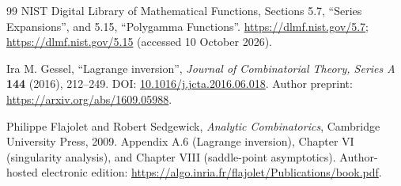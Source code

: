 \begin{thebibliography}{99}
NIST Digital Library of Mathematical Functions,
Sections 5.7, ``Series Expansions'', and 5.15, ``Polygamma Functions''.
\url{https://dlmf.nist.gov/5.7}; \url{https://dlmf.nist.gov/5.15}
(accessed 10 October 2026).

Ira M. Gessel, ``Lagrange inversion'',
\emph{Journal of Combinatorial Theory, Series A} \textbf{144} (2016),
212--249. DOI: \href{https://doi.org/10.1016/j.jcta.2016.06.018}
{10.1016/j.jcta.2016.06.018}.
Author preprint: \url{https://arxiv.org/abs/1609.05988}.

Philippe Flajolet and Robert Sedgewick,
\emph{Analytic Combinatorics}, Cambridge University Press, 2009.
Appendix A.6 (Lagrange inversion), Chapter VI (singularity analysis),
and Chapter VIII (saddle-point asymptotics).
Author-hosted electronic edition:
\url{https://algo.inria.fr/flajolet/Publications/book.pdf}.

\end{thebibliography}
